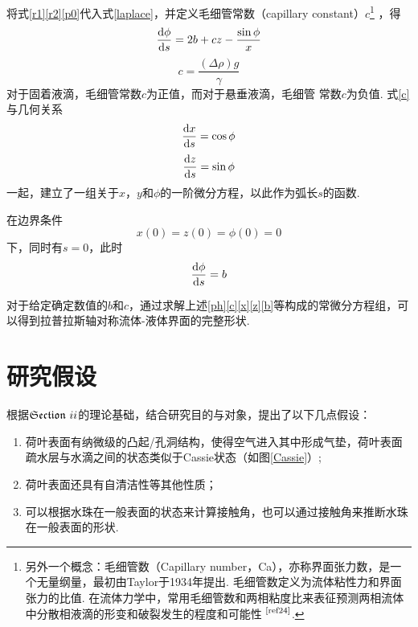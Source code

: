 \documentclass[a4paper,12pt]{article}%
\begin{document}
\begin{spacing}{1.528}
将式\eqref{r1}\eqref{r2}\eqref{p0}代入式\eqref{laplace}，并定义毛细管常数（capillary constant）$c$\footnote{另外一个概念：毛细管数（Capillary number，Ca），亦称界面张力数，是一个无量纲量，最初由Taylor于1934年提出. 毛细管数定义为流体粘性力和界面张力的比值. 在流体力学中，常用毛细管数和两相粘度比来表征预测两相流体中分散相液滴的形变和破裂发生的程度和可能性
$^\text{\cite{ref24}}$. }
，得
\begin{equation}
    \frac{\text d\phi}{\text ds}=2b+cz-\frac{\sin\phi}{x}\label{ph}
\end{equation}
\begin{equation}
    c=\frac{(\Delta\rho)g}{\gamma}\label{c}
\end{equation}
对于固着液滴，毛细管常数$c$为正值，而对于悬垂液滴，毛细管 常数$c$为负值. 式\eqref{c}与几何关系
\begin{equation}
    \frac{\text dx}{\text ds}=\cos\phi\label{x}
\end{equation}
\begin{equation}
    \frac{\text dz}{\text ds}=\sin\phi\label{z}
\end{equation}
一起，建立了一组关于$x$，$y$和$\phi$的一阶微分方程，以此作为弧长$s$的函数. 

在边界条件
\begin{equation}
    x(0)=z(0)=\phi(0)=0
\end{equation}
下，同时有$s=0$，此时
\begin{equation}
    \frac{\text d\phi}{\text ds}=b\label{b}
\end{equation}

对于给定确定数值的$b$和$c$，通过求解上述\eqref{ph}\eqref{c}\eqref{x}\eqref{z}\eqref{b}等构成的常微分方程组，可以得到拉普拉斯轴对称流体-液体界面的完整形状. 
\end{spacing}

\section{研究假设}
\begin{spacing}{1.528}%
根据$\mathfrak{Section}~\uppercase\expandafter{\romannumeral2}$的理论基础，结合研究目的与对象，提出了以下几点假设：
\begin{enumerate}
    \item 荷叶表面有纳微级的凸起/孔洞结构，使得空气进入其中形成气垫，荷叶表面疏水层与水滴之间的状态类似于Cassie状态（如图\ref{Cassie}）;
    \item 荷叶表面还具有自清洁性等其他性质；
    \item 可以根据水珠在一般表面的状态来计算接触角，也可以通过接触角来推断水珠在一般表面的形状. 
\end{enumerate}
\end{spacing}
\end{document}
